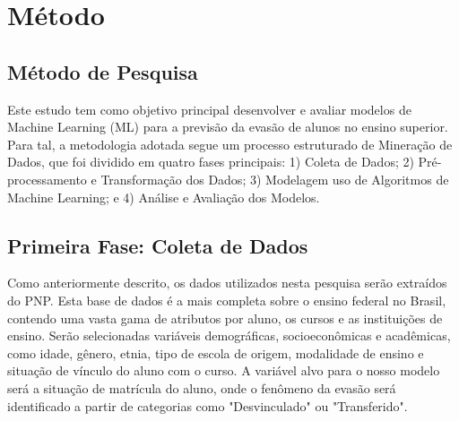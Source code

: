 \documentclass[english, spanish, brazilian]{RBIEarticle} %
\begin{document}

\section{Método}

\subsection{Método de Pesquisa}
Este estudo tem como objetivo principal desenvolver e avaliar modelos de Machine Learning (ML) para a previsão da evasão de alunos no ensino superior. Para tal, a metodologia adotada segue um processo estruturado de Mineração de Dados, que foi dividido em quatro fases principais: 1) Coleta de Dados; 2) Pré-processamento e Transformação dos Dados; 3) Modelagem uso de Algoritmos de Machine Learning; e 4) Análise e Avaliação dos Modelos.

\subsection{Primeira Fase: Coleta de Dados}
Como anteriormente descrito, os dados utilizados nesta pesquisa serão extraídos do PNP. Esta base de dados é a mais completa sobre o ensino federal no Brasil, contendo uma vasta gama de atributos por aluno, os cursos e as instituições de ensino. 
Serão selecionadas variáveis demográficas, socioeconômicas e acadêmicas, como idade, gênero, etnia, tipo de escola de origem, modalidade de ensino e situação de vínculo do aluno com o curso. A variável alvo para o nosso modelo será a situação de matrícula do aluno, onde o fenômeno da evasão será identificado a partir de categorias como "Desvinculado" ou "Transferido".
\end{document}
